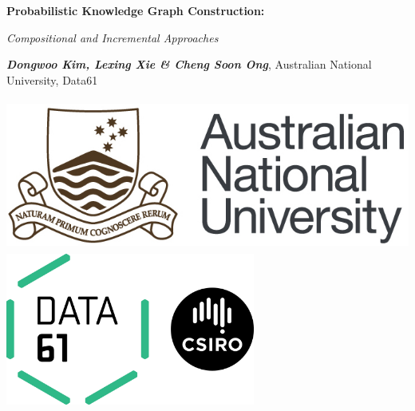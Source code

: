 \documentclass[a0,landscape]{a0poster}
\begin{document}


\begin{minipage}[m]{0.72\linewidth}
\veryHuge 
\color{NavyBlue} \textbf{Probabilistic Knowledge Graph Construction:}  %

\Huge\textit{Compositional and Incremental Approaches} %

\color{Black}
\vspace{0.5cm}
\huge \textbf{\it Dongwoo Kim, Lexing Xie \& Cheng Soon Ong}, %
\huge Australian National University, Data61\\ %
\end{minipage}
%
\begin{minipage}[m]{0.05\linewidth}

\end{minipage}
%
\begin{minipage}[m]{0.23\linewidth}
\begin{flushright}
\includegraphics[height=5cm]{./logo/anu-logo.jpg}\hspace{.8cm}\includegraphics[height=5cm]{./logo/DATA61_CSIRO_OnWhite_RGB.jpg}%
\end{flushright}
\end{minipage}
\end{document}
